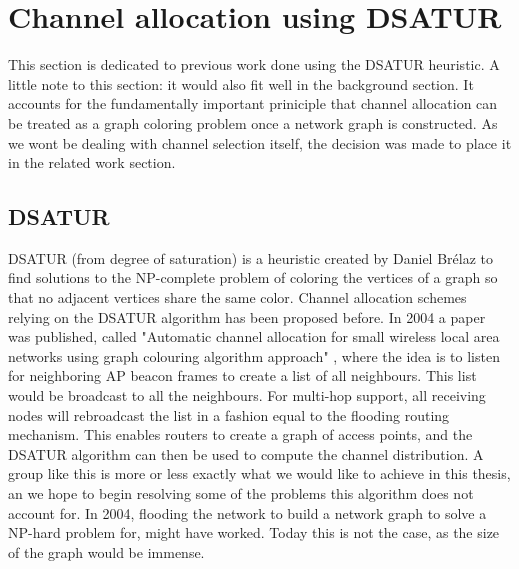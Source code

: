\section{Channel allocation using DSATUR} 
This section is dedicated to previous work done using the DSATUR heuristic. A little note to this section: it would also fit well in the background section. It accounts for the fundamentally important priniciple that
channel allocation can be treated as a graph coloring problem once a network graph is constructed. As we wont be dealing with channel selection itself, the decision was made to place it in the related work section.  

\subsection{DSATUR}
DSATUR (from degree of saturation) is a heuristic created by Daniel Brélaz \cite{Brelaz} to find solutions to the NP-complete problem of coloring the vertices of a graph so that no adjacent vertices share the same color. 
Channel allocation schemes relying on the DSATUR algorithm has been proposed before. In 2004 a paper was published, called
"Automatic channel allocation for small wireless local area networks using graph colouring algorithm approach" \cite{mahonen}, where the idea is to listen for neighboring AP beacon frames to create a list of all neighbours.
This list would be broadcast to all the neighbours. For multi-hop support, all receiving nodes will rebroadcast the list in a fashion equal to the flooding routing mechanism. This enables routers to create a graph of access points, and the DSATUR algorithm can then be used to compute the channel distribution. A group like this is more or less exactly what we would like to achieve in this thesis, 
an we hope to begin resolving some of the problems this algorithm does not account for. In 2004, flooding the network to build a network graph to solve a NP-hard problem for, might have worked. Today this is not the case, as the size of the graph would be immense. 



